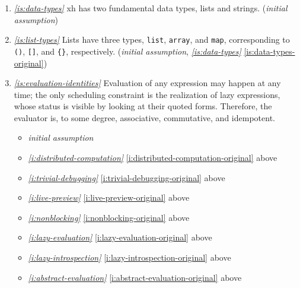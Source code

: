 \documentclass{report}
\makeatletter
\newcommand*{\Label}[2]{%
  \@bsphack
  \begingroup
    \label{#1-original}%
    \def\@currentlabel{#2}%
    \label{#1}%
  \endgroup
  \@esphack
}
\newcommand{\initial}{{\em initial assumption}}
\newcommand{\refboth}[1]{{\em \ref{#1}} \ref{#1-original}}
\makeatother
\begin{document}
\begin{enumerate}
\item{}\Label{is:data-types}{xhs.datatypes}{\em\ref{is:data-types}}
  xh has two fundamental data types, lists and strings.
(\initial)
\item{}\Label{is:list-types}{xhs.listtypes}{\em\ref{is:list-types}}
  Lists have three types, {\tt list}, {\tt array}, and {\tt map},
  corresponding to \verb|()|, \verb|[]|, and \verb|{}|, respectively.
(\initial, \refboth{is:data-types})

\item{}\Label{is:evaluation-identities}{xhs.eval-identities}{\em\ref{is:evaluation-identities}}
  Evaluation of any expression may happen at any time; the only scheduling
  constraint is the realization of lazy expressions, whose status is
  visible by looking at their quoted forms. Therefore, the evaluator is, to
  some degree, associative, commutative, and idempotent.
\begin{itemize}
\item \initial
\item \refboth{i:distributed-computation} above
\item \refboth{i:trivial-debugging} above
\item \refboth{i:live-preview} above
\item \refboth{i:nonblocking} above
\item \refboth{i:lazy-evaluation} above
\item \refboth{i:lazy-introspection} above
\item \refboth{i:abstract-evaluation} above
\end{itemize}


\end{enumerate}
\end{document}
